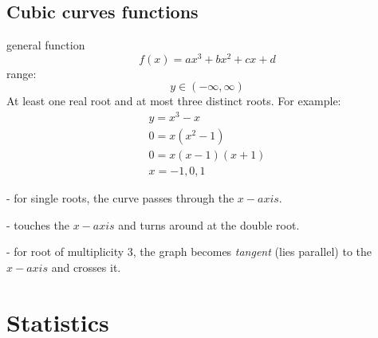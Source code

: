 \documentclass{article}
\begin{document}
\subsection{Cubic curves functions}
general function
\begin{equation}
  f(x) = ax^3 + bx^2 + cx + d
\end{equation}
range:
\begin{equation}
  y \in (-\infty, \infty)
\end{equation}
At least one real root and at most three distinct roots. For example:
\begin{equation}
  \begin{gathered}
    y = x^3 - x \\
    0 = x(x^2 - 1) \\
    0 = x(x - 1)(x + 1) \\
    x = -1, 0, 1
  \end{gathered}
\end{equation}

- for single roots, the curve passes through the $x-axis$.

- touches the $x-axis$ and turns around at the double root.

- for root of multiplicity 3, the graph becomes \textit{tangent} (lies parallel) to the $x-axis$ and crosses it.

\section{Statistics}
\end{document}
